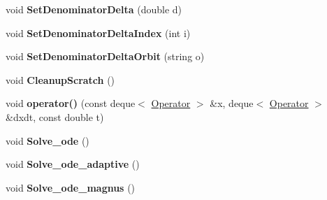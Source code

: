 \begin{DoxyCompactItemize}
\mbox{\label{classIMSRGSolver_a2974135e8880dc2a1f49fc7334d97d54}} 
void {\bfseries Set\+Denominator\+Delta} (double d)
\item 
\mbox{\label{classIMSRGSolver_a9f4b53972f5a4760eeffbe61493365fe}} 
void {\bfseries Set\+Denominator\+Delta\+Index} (int i)
\item 
\mbox{\label{classIMSRGSolver_aaa1c52eab16f8c8ea0d817bcdd112796}} 
void {\bfseries Set\+Denominator\+Delta\+Orbit} (string o)
\item 
\mbox{\label{classIMSRGSolver_a5dffe1773d536656e3e83a6c286a93da}} 
void {\bfseries Cleanup\+Scratch} ()
\item 
\mbox{\label{classIMSRGSolver_abf1867f5ae1c24ceaffc3ec75ec8e64c}} 
void {\bfseries operator()} (const deque$<$ \hyperlink{classOperator}{Operator} $>$ \&x, deque$<$ \hyperlink{classOperator}{Operator} $>$ \&dxdt, const double t)
\item 
\mbox{\label{classIMSRGSolver_af6bb68dc6d154d2a41adc680ead68d53}} 
void {\bfseries Solve\+\_\+ode} ()
\item 
\mbox{\label{classIMSRGSolver_ab6a9dedc4b17ba6929fda6756f381a6d}} 
void {\bfseries Solve\+\_\+ode\+\_\+adaptive} ()
\item 
\mbox{\label{classIMSRGSolver_a8e8671ef4ad4e52e8c762aaffe8932a2}} 
void {\bfseries Solve\+\_\+ode\+\_\+magnus} ()
\end{DoxyCompactItemize}
